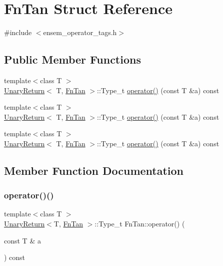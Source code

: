 \hypertarget{structFnTan}{}\section{Fn\+Tan Struct Reference}
\label{structFnTan}


{\ttfamily \#include $<$ensem\+\_\+operator\+\_\+tags.\+h$>$}

\subsection*{Public Member Functions}
\begin{DoxyCompactItemize}
\item 
{\footnotesize template$<$class T $>$ }\\\mbox{\hyperlink{structUnaryReturn}{Unary\+Return}}$<$ T, \mbox{\hyperlink{structFnTan}{Fn\+Tan}} $>$\+::Type\+\_\+t \mbox{\hyperlink{structFnTan_a067d849927778152282097f8efe5cdf1}{operator()}} (const T \&a) const
\item 
{\footnotesize template$<$class T $>$ }\\\mbox{\hyperlink{structUnaryReturn}{Unary\+Return}}$<$ T, \mbox{\hyperlink{structFnTan}{Fn\+Tan}} $>$\+::Type\+\_\+t \mbox{\hyperlink{structFnTan_a067d849927778152282097f8efe5cdf1}{operator()}} (const T \&a) const
\item 
{\footnotesize template$<$class T $>$ }\\\mbox{\hyperlink{structUnaryReturn}{Unary\+Return}}$<$ T, \mbox{\hyperlink{structFnTan}{Fn\+Tan}} $>$\+::Type\+\_\+t \mbox{\hyperlink{structFnTan_a067d849927778152282097f8efe5cdf1}{operator()}} (const T \&a) const
\end{DoxyCompactItemize}


\subsection{Member Function Documentation}
\mbox{\label{structFnTan_a067d849927778152282097f8efe5cdf1}} 
\subsubsection{\texorpdfstring{operator()()}{operator()()}\hspace{0.1cm}{\footnotesize\ttfamily [1/3]}}
{\footnotesize\ttfamily template$<$class T $>$ \\
\mbox{\hyperlink{structUnaryReturn}{Unary\+Return}}$<$T, \mbox{\hyperlink{structFnTan}{Fn\+Tan}} $>$\+::Type\+\_\+t Fn\+Tan\+::operator() (\begin{DoxyParamCaption}\item[{const T \&}]{a }\end{DoxyParamCaption}) const\hspace{0.3cm}{\ttfamily [inline]}}

